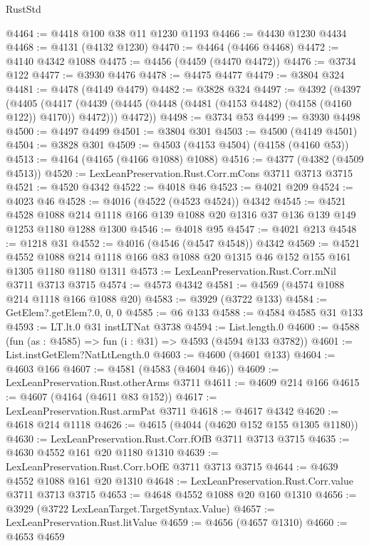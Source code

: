 \begin{lexlean}{RustStd}
\begin{coremodule}
@4464 := @4418 @100 @38 @11 @1230 @1193
@4466 := @4430 @1230 @4434
@4468 := @4131 (@4132 @1230)
@4470 := @4464 (@4466 @4468)
@4472 := @4140 @4342 @1088
@4475 := @4456 (@4459 (@4470 @4472))
@4476 := @3734 @122
@4477 := @3930 @4476
@4478 := @4475 @4477
@4479 := @3804 @324
@4481 := @4478 (@4149 @4479)
@4482 := @3828 @324
@4497 := @4392
    (@4397
      (@4405
        (@4417 (@4439 (@4445 (@4448 (@4481 (@4153 @4482) (@4158 (@4160 @122)) @4170)) @4472)))
        @4472))
@4498 := @3734 @53
@4499 := @3930 @4498
@4500 := @4497 @4499
@4501 := @3804 @301
@4503 := @4500 (@4149 @4501)
@4504 := @3828 @301
@4509 := @4503 (@4153 @4504) (@4158 (@4160 @53))
@4513 := @4164 (@4165 (@4166 @1088) @1088)
@4516 := @4377 (@4382 (@4509 @4513))
@4520 := LexLeanPreservation.Rust.Corr.mCons @3711 @3713 @3715
@4521 := @4520 @4342
@4522 := @4018 @46
@4523 := @4021 @209
@4524 := @4023 @46
@4528 := @4016 (@4522 (@4523 @4524)) @4342
@4545 := @4521
    @4528
    @1088
    @214
    @1118
    @166
    @139
    @1088
    @20
    @1316
    @37
    @136
    @139
    @149
    @1253
    @1180
    @1288
    @1300
@4546 := @4018 @95
@4547 := @4021 @213
@4548 := @1218 @31
@4552 := @4016 (@4546 (@4547 @4548)) @4342
@4569 := @4521
    @4552
    @1088
    @214
    @1118
    @166
    @83
    @1088
    @20
    @1315
    @46
    @152
    @155
    @161
    @1305
    @1180
    @1180
    @1311
@4573 := LexLeanPreservation.Rust.Corr.mNil @3711 @3713 @3715
@4574 := @4573 @4342
@4581 := @4569 (@4574 @1088 @214 @1118 @166 @1088 @20)
@4583 := @3929 (@3722 @133)
@4584 := GetElem?.getElem?.{0, 0, 0}
@4585 := @6 @133
@4588 := @4584 @4585 @31 @133
@4593 := LT.lt.{0} @31 instLTNat @3738
@4594 := List.length.{0}
@4600 := @4588 (fun (as : @4585) => fun (i : @31) => @4593 (@4594 @133 @3782))
@4601 := List.instGetElem?NatLtLength.{0}
@4603 := @4600 (@4601 @133)
@4604 := @4603 @166
@4607 := @4581 (@4583 (@4604 @46))
@4609 := LexLeanPreservation.Rust.otherArms @3711
@4611 := @4609 @214 @166
@4615 := @4607 (@4164 (@4611 @83 @152))
@4617 := LexLeanPreservation.Rust.armPat @3711
@4618 := @4617 @4342
@4620 := @4618 @214 @1118
@4626 := @4615 (@4044 (@4620 @152 @155 @1305 @1180))
@4630 := LexLeanPreservation.Rust.Corr.fOfB @3711 @3713 @3715
@4635 := @4630 @4552 @161 @20 @1180 @1310
@4639 := LexLeanPreservation.Rust.Corr.bOfE @3711 @3713 @3715
@4644 := @4639 @4552 @1088 @161 @20 @1310
@4648 := LexLeanPreservation.Rust.Corr.value @3711 @3713 @3715
@4653 := @4648 @4552 @1088 @20 @160 @1310
@4656 := @3929 (@3722 LexLeanTarget.TargetSyntax.Value)
@4657 := LexLeanPreservation.Rust.litValue
@4659 := @4656 (@4657 @1310)
@4660 := @4653 @4659

\end{coremodule}
\end{lexlean}
